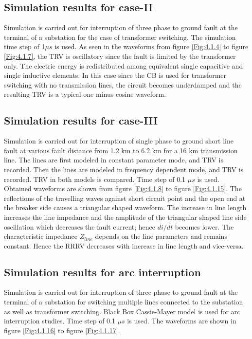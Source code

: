 \subsection{Simulation results for case-II}
Simulation is carried out for interruption of three phase to ground fault at the terminal of a substation for the case of transformer switching. The simulation time step of 1$\mu s$ is used. As seen in the waveforms from figure \ref{Fig:4.1.4} to figure \ref{Fig:4.1.7}, the TRV is oscillatory since the fault is limited by the transformer only. The electric energy is redistributed among equivalent single capacitive and single inductive elements. In this case since the CB is used for transformer switching with no transmission lines, the circuit becomes underdamped and the resulting TRV is a typical one minus cosine waveform.

\subsection{Simulation results for case-III}
Simulation is carried out for interruption of single phase to ground short line fault at various fault distance from 1.2 km to 6.2 km for a 16 km transmission line. The lines are first modeled in constant parameter mode, and TRV is recorded. Then the lines are modeled in frequency dependent mode, and TRV is recorded. TRV in both models is compared. Time step of 0.1 $\mu s$ is used. Obtained waveforms are shown from figure \ref{Fig:4.1.8} to figure \ref{Fig:4.1.15}. The reflections of the travelling waves against short circuit point and the open end at the breaker side causes a triangular shaped waveform. The increase in line length increases the line impedance and the amplitude of the triangular shaped line side oscillation which decreases the fault current; hence $di/dt$ becomes lower. The characteristic impedance $Z_{line}$ depends on the line parameters and remains constant. Hence the RRRV decreases with increase in line length and vice-versa.

\subsection{Simulation results for arc interruption}
Simulation is carried out for interruption of three phase to ground fault at the terminal of a substation for switching multiple lines connected to the substation as well as transformer switching. Black Box Cassie-Mayer model is used for arc interruption studies. Time step of 0.1 $\mu s$ is used. The waveforms are shown in figure \ref{Fig:4.1.16} to figure \ref{Fig:4.1.17}.

